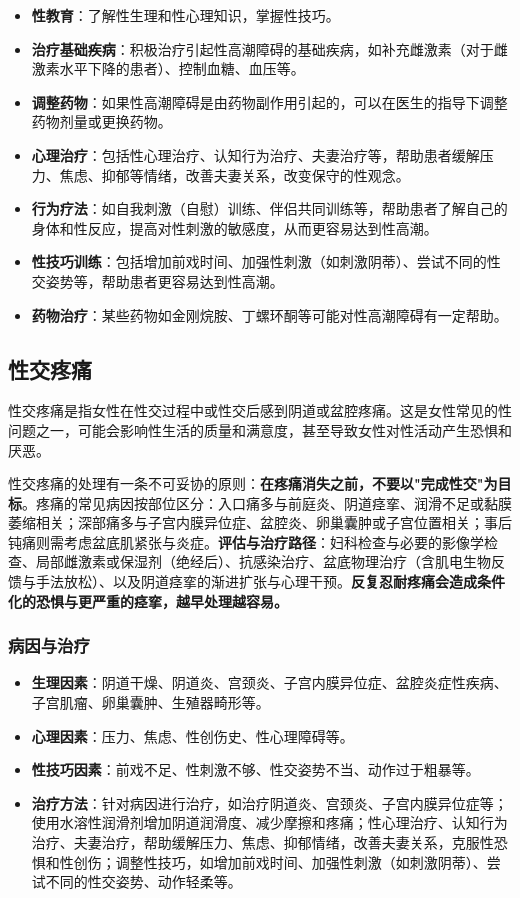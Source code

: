 \begin{itemize}
\item \textbf{性教育}：了解性生理和性心理知识，掌握性技巧。
\item \textbf{治疗基础疾病}：积极治疗引起性高潮障碍的基础疾病，如补充雌激素（对于雌激素水平下降的患者）、控制血糖、血压等。
\item \textbf{调整药物}：如果性高潮障碍是由药物副作用引起的，可以在医生的指导下调整药物剂量或更换药物。
\item \textbf{心理治疗}：包括性心理治疗、认知行为治疗、夫妻治疗等，帮助患者缓解压力、焦虑、抑郁等情绪，改善夫妻关系，改变保守的性观念。
\item \textbf{行为疗法}：如自我刺激（自慰）训练、伴侣共同训练等，帮助患者了解自己的身体和性反应，提高对性刺激的敏感度，从而更容易达到性高潮。
\item \textbf{性技巧训练}：包括增加前戏时间、加强性刺激（如刺激阴蒂）、尝试不同的性交姿势等，帮助患者更容易达到性高潮。
\item \textbf{药物治疗}：某些药物如金刚烷胺、丁螺环酮等可能对性高潮障碍有一定帮助。
\end{itemize}

\subsection{性交疼痛}

性交疼痛是指女性在性交过程中或性交后感到阴道或盆腔疼痛。这是女性常见的性问题之一，可能会影响性生活的质量和满意度，甚至导致女性对性活动产生恐惧和厌恶。

性交疼痛的处理有一条不可妥协的原则：\textbf{在疼痛消失之前，不要以"完成性交"为目标}。疼痛的常见病因按部位区分：入口痛多与前庭炎、阴道痉挛、润滑不足或黏膜萎缩相关；深部痛多与子宫内膜异位症、盆腔炎、卵巢囊肿或子宫位置相关；事后钝痛则需考虑盆底肌紧张与炎症。\textbf{评估与治疗路径}：妇科检查与必要的影像学检查、局部雌激素或保湿剂（绝经后）、抗感染治疗、盆底物理治疗（含肌电生物反馈与手法放松）、以及阴道痉挛的渐进扩张与心理干预。\textbf{反复忍耐疼痛会造成条件化的恐惧与更严重的痉挛，越早处理越容易。}

\subsubsection{病因与治疗}

\begin{itemize}
\item \textbf{生理因素}：阴道干燥、阴道炎、宫颈炎、子宫内膜异位症、盆腔炎症性疾病、子宫肌瘤、卵巢囊肿、生殖器畸形等。
\item \textbf{心理因素}：压力、焦虑、性创伤史、性心理障碍等。
\item \textbf{性技巧因素}：前戏不足、性刺激不够、性交姿势不当、动作过于粗暴等。
\item \textbf{治疗方法}：针对病因进行治疗，如治疗阴道炎、宫颈炎、子宫内膜异位症等；使用水溶性润滑剂增加阴道润滑度、减少摩擦和疼痛；性心理治疗、认知行为治疗、夫妻治疗，帮助缓解压力、焦虑、抑郁情绪，改善夫妻关系，克服性恐惧和性创伤；调整性技巧，如增加前戏时间、加强性刺激（如刺激阴蒂）、尝试不同的性交姿势、动作轻柔等。
\end{itemize}

